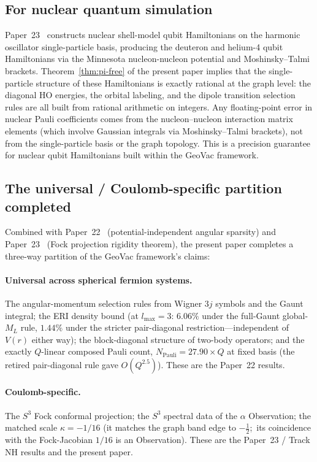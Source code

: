 \documentclass[twocolumn,pra,amsmath,amssymb,superscriptaddress]{revtex4-2}
\begin{document}
\subsection{For nuclear quantum simulation}
\label{sec:nuclear}

Paper~23~\cite{paper23} constructs nuclear shell-model qubit
Hamiltonians on the harmonic oscillator single-particle basis,
producing the deuteron and helium-4 qubit Hamiltonians via the
Minnesota nucleon-nucleon potential and Moshinsky--Talmi
brackets.  Theorem~\ref{thm:pi-free} of the present paper
implies that the single-particle structure of these Hamiltonians
is exactly rational at the graph level: the diagonal HO
energies, the orbital labeling, and the dipole transition
selection rules are all built from rational arithmetic on
integers.  Any floating-point error in nuclear Pauli coefficients
comes from the nucleon--nucleon interaction matrix elements
(which involve Gaussian integrals via Moshinsky--Talmi brackets),
not from the single-particle basis or the graph topology.  This
is a precision guarantee for nuclear qubit Hamiltonians built
within the GeoVac framework.

\subsection{The universal / Coulomb-specific partition completed}
\label{sec:partition}

Combined with Paper~22~\cite{paper22} (potential-independent
angular sparsity) and Paper~23~\cite{paper23} (Fock projection
rigidity theorem), the present paper completes a three-way
partition of the GeoVac framework's claims:

\paragraph{Universal across spherical fermion systems.}
The angular-momentum selection rules from Wigner $3j$ symbols
and the Gaunt integral; the ERI density bound (at $l_{\max}=3$:
$6.06\%$ under the full-Gaunt global-$M_L$ rule, $1.44\%$ under the
stricter pair-diagonal restriction---independent of $V(r)$ either way); the block-diagonal
structure of two-body operators; and the exactly $Q$-linear composed
Pauli count, $N_{\mathrm{Pauli}} = 27.90 \times Q$ at fixed basis
(the retired pair-diagonal rule gave $O(Q^{2.5})$).  These are the
Paper~22 results.

\paragraph{Coulomb-specific.}
The $S^3$ Fock conformal projection; the $S^3$ spectral data of the
$\alpha$ Observation; the matched scale $\kappa = -1/16$ (it matches
the graph band edge to $-\tfrac12$;\ its coincidence with the
Fock-Jacobian $1/16$ is an Observation).  These are the Paper~23 / Track NH results
and the present paper.
\end{document}
